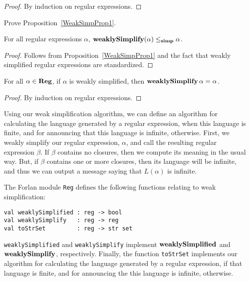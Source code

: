 \begin{proof}
By induction on regular expressions.
\end{proof}

\begin{exercise}
\label{WeakSimpExercise}
Prove Proposition~\ref{WeakSimpProp1}.
\end{exercise}

\begin{corollary}
\label{WeakSimpProp1Cor}
For all regular expressions $\alpha$,
$\mathbf{weaklySimplify}(\alpha) \mathrel{\leq_{\mathbf{simp}}} \alpha$.
\end{corollary}

\begin{proof}
Follows from Proposition~\ref{WeakSimpProp1} and the fact
that weakly simplified regular expressions are standardized.
\end{proof}

\begin{proposition}
\label{WeakSimpProp5}
For all $\alpha\in\mathbf{Reg}$, if $\alpha$ is weakly simplified, then
$\mathbf{weaklySimplify}\,\alpha = \alpha$.
\end{proposition}

\begin{proof}
By induction on regular expressions.
\end{proof}

Using our weak simplification algorithm, we can define an algorithm
for calculating the language generated by a regular expression, when
this language is finite, and for announcing that this language is
infinite, otherwise.  First, we weakly simplify our regular
expression, $\alpha$, and call the resulting regular expression
$\beta$.  If $\beta$ contains no closures, then we compute its meaning
in the usual way.  But, if $\beta$ contains one or more closures, then
its language will be infinite, and thus we can output a message saying
that $L(\alpha)$ is infinite.

The Forlan module \texttt{Reg} defines the following functions relating
to weak simplification:
\begin{verbatim}
val weaklySimplified : reg -> bool
val weaklySimplify   : reg -> reg
val toStrSet         : reg -> str set
\end{verbatim}
%
%
%
\texttt{weaklySimplified} and \texttt{weaklySimplify}
implement $\mathbf{weaklySimplified}$ and $\mathbf{weaklySimplify}$,
respectively. Finally, the function \texttt{toStrSet} implements our
algorithm for calculating the language generated by a regular
expression, if that language is finite, and for announcing the this
language is infinite, otherwise.

